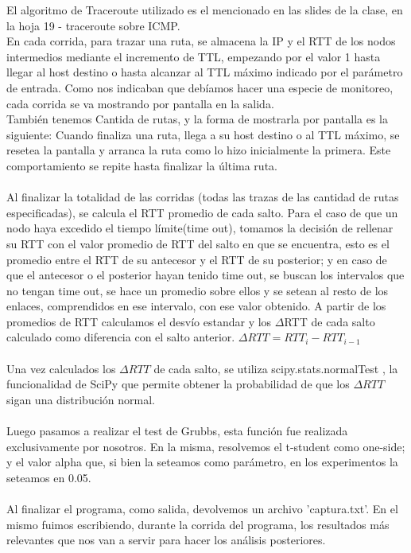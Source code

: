 El algoritmo de Traceroute utilizado es el mencionado en las slides de la clase, en la hoja 19 - traceroute sobre ICMP.\\
En cada corrida, para trazar una ruta, se almacena la IP y el RTT de los nodos intermedios mediante el incremento de TTL, empezando por el valor 1 hasta llegar al host destino o hasta alcanzar al TTL máximo indicado por el parámetro de entrada. Como nos indicaban que deb\'iamos hacer una especie de monitoreo, cada corrida se va mostrando por pantalla en la salida.\\
Tambi\'en tenemos Cantida de rutas, y la forma de mostrarla por pantalla es la siguiente: Cuando finaliza una ruta, llega a su host destino o al TTL m\'aximo, se resetea la pantalla y arranca la ruta como lo hizo inicialmente la primera. Este comportamiento se repite hasta finalizar la \'ultima ruta.
\\
\\
Al finalizar la totalidad de las corridas (todas las trazas de las cantidad de rutas especificadas), se calcula el RTT promedio de cada salto. Para el caso de que un nodo haya excedido el tiempo límite(time out), tomamos la decisión de rellenar su RTT con el valor promedio de RTT del salto en que se encuentra, esto es el promedio entre el RTT de su antecesor y el RTT de su posterior; y en caso de que el antecesor o el posterior hayan tenido time out, se buscan los intervalos que no tengan time out, se hace un promedio sobre ellos y se setean al resto de los enlaces, comprendidos en ese intervalo, con ese valor obtenido. A partir de los promedios de RTT calculamos el desvío estandar y los $\Delta$RTT de cada salto calculado como diferencia con el salto anterior.
$\Delta RTT = RTT_{i} - RTT _{i-1}$
\\
\\
Una vez calculados los $\Delta RTT$ de cada salto, se utiliza scipy.stats.normalTest , la funcionalidad de SciPy que permite obtener la probabilidad de que los $\Delta RTT$ sigan una distribución normal.
\\
\\
Luego pasamos a realizar el test de Grubbs, esta funci\'on fue realizada exclusivamente por nosotros. En la misma, resolvemos el t-student como one-side; y el valor alpha que, si bien la seteamos como par\'ametro, en los experimentos la seteamos en 0.05.
\\
\\
Al finalizar el programa, como salida, devolvemos un archivo 'captura.txt'. En el mismo fuimos escribiendo, durante la corrida del programa, los resultados m\'as relevantes que nos van a servir para hacer los an\'alisis posteriores.


